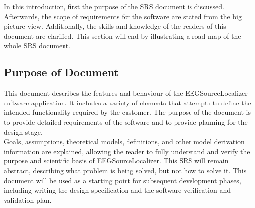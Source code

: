 \documentclass[12pt]{article}
\begin{document}
In this introduction, first the purpose of the SRS document is discussed. Afterwards, the scope of requirements for the software are stated from the big picture view. Additionally, the skills and knowledge of the readers of this document are clarified. This section will end by illustrating a road map of the whole SRS document.



\subsection{Purpose of Document}
This document describes the features and behaviour of the EEGSourceLocalizer software application. It includes a variety of elements that attempts to define the intended functionality required by the customer. The purpose of the document is to provide detailed requirements of the software and to provide planning for the design stage. \\

Goals, assumptions, theoretical models, definitions, and other model derivation information are explained, allowing the reader to fully understand and verify the purpose and scientific basis of EEGSourceLocalizer. This SRS will remain abstract, describing what problem is being solved, but not how to solve it. This document will be used as a starting point for subsequent development phases, including writing the design specification and the software verification and validation plan.

\end{document}
